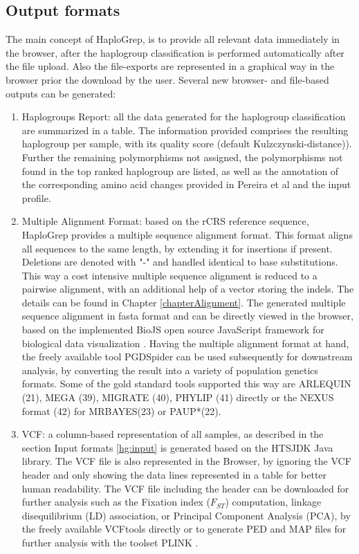 \subsection{Output formats}

The main concept of HaploGrep, is to provide all relevant data immediately in the browser, after the haplogroup classification is performed automatically after the file upload. Also the file-exports are represented in a graphical way in the browser prior the download by the user. Several new browser- and file-based outputs can be generated:
\begin{enumerate}
\item Haplogroups Report: all the data generated for the haplogroup classification are summarized in a table. The information provided comprises the resulting haplogroup per sample, with its quality score (default Kulzczynski-distance)). Further the remaining polymorphisms not assigned, the polymorphisms not found in the top ranked haplogroup are listed, as well as the annotation of the corresponding amino acid changes provided in Pereira et al \cite{Pereira2011} and the input profile.
\item Multiple Alignment Format: based on the rCRS reference sequence, HaploGrep provides a multiple sequence alignment format. This format aligns all sequences to the same length, by extending it for insertions if present. Deletions are denoted with "-" and handled identical to base substitutions. This way a cost intensive multiple sequence alignment is reduced to a pairwise alignment, with an additional help of a vector storing the indels. The details can be found in Chapter \ref{chapterAlignment}. The  generated multiple sequence alignment in fasta format and can be directly viewed in the browser, based on the implemented BioJS open source JavaScript framework for biological data visualization \cite{Gomez2013}. Having the multiple alignment format at hand, the freely available tool PGDSpider \cite{Lischer2012} can be used subsequently for downstream analysis, by converting the result into a variety of population genetics formats. Some of the gold standard tools supported this way are ARLEQUIN (21), MEGA (39), 
MIGRATE (40), PHYLIP (41) directly or the NEXUS format (42) for MRBAYES(23) or PAUP*(22).
\item VCF: a column-based representation of all samples, as described in the section Input formats \ref{hg:input} is generated based on the HTSJDK Java library. The VCF file is also represented in the Browser, by ignoring the VCF header and only showing the data lines represented in a table for better human readability. The VCF file including the header can be downloaded for further analysis such as the Fixation index ($F_{ST}$) computation, linkage disequilibrium (LD) association, or Principal Component Analysis (PCA), by the freely available VCFtools \cite{Danecek2011} directly or to generate PED and MAP files for further analysis with the toolset PLINK \cite{Purcell2007}.

\end{enumerate}
